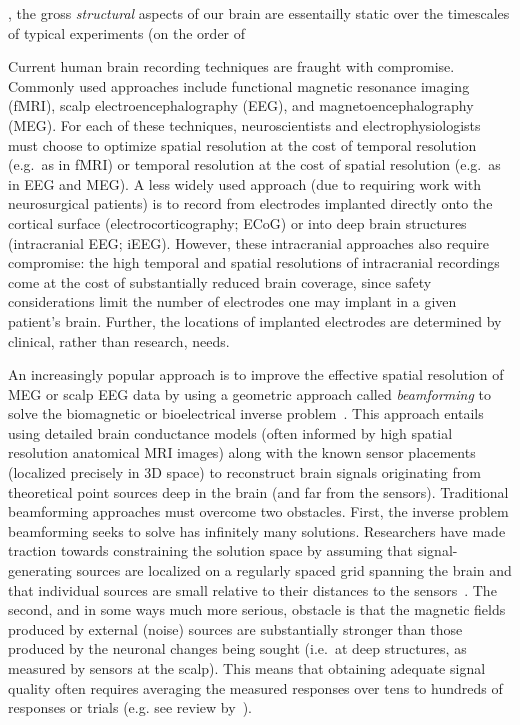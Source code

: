 

  





, the gross \textit{structural} aspects of our brain are essentailly static over the timescales of typical experiments (on the order of 

Current human brain recording techniques are fraught with compromise.
Commonly used approaches include functional magnetic resonance imaging
(fMRI), scalp electroencephalography (EEG), and magnetoencephalography
(MEG).  For each of these techniques, neuroscientists
and electrophysiologists must choose to optimize spatial resolution
at the cost of temporal resolution (e.g.\ as in fMRI) or temporal
resolution at the cost of spatial resolution (e.g.\ as in EEG
and MEG).  A less widely used approach (due to requiring work with
neurosurgical patients) is to record from electrodes implanted
directly onto the cortical surface (electrocorticography; ECoG) or
into deep brain structures (intracranial EEG; iEEG).  However, these
intracranial approaches also require compromise: the high temporal and
spatial resolutions of intracranial recordings come at the cost of
substantially reduced brain coverage, since safety considerations
limit the number of electrodes one may implant in a given patient's
brain.  Further, the locations of implanted electrodes are determined by clinical,
rather than research, needs.

An increasingly popular approach is to improve the effective spatial resolution
of MEG or scalp EEG data by using a geometric approach called
\textit{beamforming} to solve the biomagnetic or bioelectrical inverse
problem~\cite{Sarv87}.  This approach entails using detailed brain
conductance models (often informed by high spatial resolution
anatomical MRI images) along with the known sensor placements
(localized precisely in 3D space) to reconstruct brain signals
originating from theoretical point sources deep in the brain (and far
from the sensors).  Traditional beamforming approaches must overcome
two obstacles.  First, the inverse problem beamforming seeks to solve
has infinitely many solutions.  Researchers have made traction towards
constraining the solution space by assuming that signal-generating
sources are localized on a regularly spaced grid spanning the brain
and that individual sources are small relative to their distances to
the sensors~\cite{Snyd91, BailEtal01, HillEtal05}.  The second, and in
some ways much more serious, obstacle is that the magnetic fields
produced by external (noise) sources are substantially stronger than
those produced by the neuronal changes being sought (i.e.\ at deep structures, as measured by sensors at the scalp).  This means that
obtaining adequate signal quality often requires averaging the measured
responses over tens to hundreds of responses or trials (e.g. see
review by~\cite{HillEtal05}).

